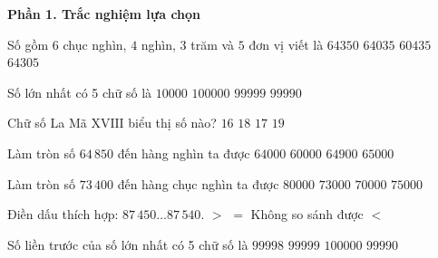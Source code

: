 \textbf{Phần 1. Trắc nghiệm lựa chọn}

\begin{ex} %
Số gồm $6$ chục nghìn, $4$ nghìn, $3$ trăm và $5$ đơn vị viết là
\choice
{$64350$}
{$64035$}
{$60435$}
{\True $64305$}
\end{ex}

\begin{ex} %
Số lớn nhất có 5 chữ số là
\choice
{$10000$}
{$100000$}
{\True $99999$}
{$99990$}
\end{ex}

\begin{ex} %
Chữ số La Mã $\text{XVIII}$ biểu thị số nào?
\choice
{$16$}
{\True $18$}
{$17$}
{$19$}
\end{ex}

\begin{ex} %
Làm tròn số $64\,850$ đến hàng nghìn ta được
\choice
{$64000$}
{$60000$}
{$64900$}
{\True $65000$}
\end{ex}

\begin{ex} %
Làm tròn số $73\,400$ đến hàng chục nghìn ta được
\choice
{$80000$}
{$73000$}
{\True $70000$}
{$75000$}
\end{ex}

\begin{ex} %
Điền dấu thích hợp: $87\,450 \dots 87\,540$.
\choice
{$>$}
{$=$}
{Không so sánh được}
{\True $<$}
\end{ex}

\begin{ex} %
Số liền trước của số lớn nhất có 5 chữ số là
\choice
{\True $99998$}
{$99999$}
{$100000$}
{$99990$}
\end{ex}

